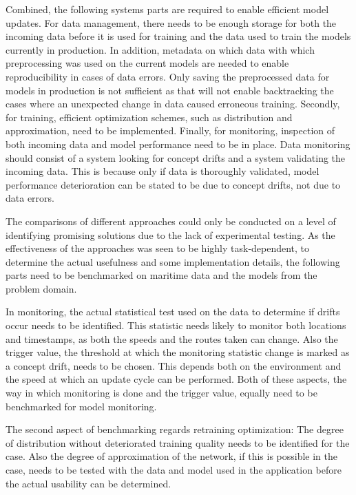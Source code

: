 Combined, the following systems parts are required to enable efficient model updates. For data management, there needs to be enough storage for both the incoming data before it is used for training and the data used to train the models currently in production. In addition, metadata on which data with which preprocessing was used on the current models are needed to enable reproducibility in cases of data errors. Only saving the preprocessed data for models in production is not sufficient as that will not enable backtracking the cases where an unexpected change in data caused erroneous training. Secondly, for training, efficient optimization schemes, such as distribution and approximation, need to be implemented. Finally, for monitoring, inspection of both incoming data and model performance need to be in place. Data monitoring should consist of a system looking for concept drifts and a system validating the incoming data. This is because only if data is thoroughly validated, model performance deterioration can be stated to be due to concept drifts, not due to data errors.

The comparisons of different approaches could only be conducted on a level of identifying promising solutions due to the lack of experimental testing. As the effectiveness of the approaches was seen to be highly task-dependent, to determine the actual usefulness and some implementation details, the following parts need to be benchmarked on maritime data and the models from the problem domain.

In monitoring, the actual statistical test used on the data to determine if drifts occur needs to be identified. This statistic needs likely to monitor both locations and timestamps, as both the speeds and the routes taken can change. Also the trigger value, the threshold at which the monitoring statistic change is marked as a concept drift, needs to be chosen. This depends both on the environment and the speed at which an update cycle can be performed. Both of these aspects, the way in which monitoring is done and the trigger value, equally need to be benchmarked for model monitoring.

The second aspect of benchmarking regards retraining optimization: The degree of distribution without deteriorated training quality needs to be identified for the case. Also the degree of approximation of the network, if this is possible in the case, needs to be tested with the data and model used in the application before the actual usability can be determined.

